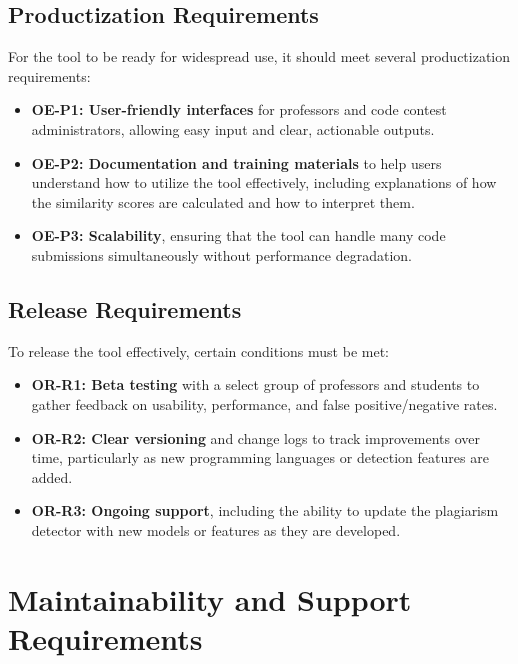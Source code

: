 \documentclass[12pt]{article}
\begin{document}
\subsection{Productization Requirements}
For the tool to be ready for widespread use, it should meet several productization requirements:
\begin{itemize}
    \item \textbf{OE-P1: User-friendly interfaces} for professors and code contest administrators, allowing easy input and clear, actionable outputs.
    \item \textbf{OE-P2: Documentation and training materials} to help users understand how to utilize the tool effectively, including explanations of how the similarity scores are calculated and how to interpret them.
    \item \textbf{OE-P3: Scalability}, ensuring that the tool can handle many code submissions simultaneously without performance degradation.
\end{itemize}

\subsection{Release Requirements}
To release the tool effectively, certain conditions must be met:
\begin{itemize}
    \item \textbf{OR-R1: Beta testing} with a select group of professors and students to gather feedback on usability, performance, and false positive/negative rates.
    \item \textbf{OR-R2: Clear versioning} and change logs to track improvements over time, particularly as new programming languages or detection features are added.
    \item \textbf{OR-R3: Ongoing support}, including the ability to update the plagiarism detector with new models or features as they are developed.
\end{itemize}

\section{Maintainability and Support Requirements}
\end{document}
